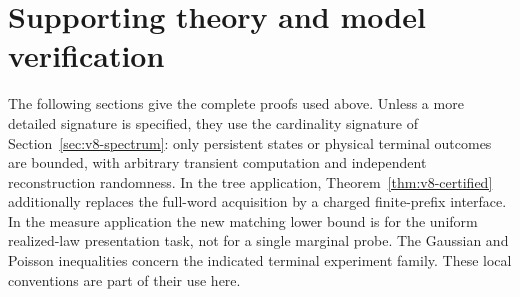 

















\bigskip
\section*{Supporting theory and model verification}
The following sections give the complete proofs used above. Unless a
more detailed signature is specified, they use the cardinality
signature of Section~\ref{sec:v8-spectrum}: only persistent states or
physical terminal outcomes are bounded, with arbitrary transient
computation and independent reconstruction randomness. In the tree
application, Theorem~\ref{thm:v8-certified} additionally replaces the
full-word acquisition by a charged finite-prefix interface. In the
measure application the new matching lower bound is for the uniform
realized-law presentation task, not for a single marginal probe.
The Gaussian and Poisson inequalities concern the indicated terminal
experiment family. These local conventions are part of their use here.







